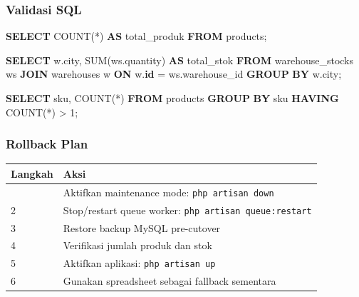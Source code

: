 \documentclass[
]{article}
\newenvironment{Shaded}{}{}
\newcommand{\DecValTok}[1]{\textcolor[rgb]{0.25,0.63,0.44}{#1}}
\newcommand{\FunctionTok}[1]{\textcolor[rgb]{0.02,0.16,0.49}{#1}}
\newcommand{\KeywordTok}[1]{\textcolor[rgb]{0.00,0.44,0.13}{\textbf{#1}}}
\newcommand{\NormalTok}[1]{#1}
\newcommand{\OperatorTok}[1]{\textcolor[rgb]{0.40,0.40,0.40}{#1}}
\begin{document}
\subsubsection{Validasi SQL}\label{validasi-sql}

\begin{Shaded}
\begin{Highlighting}[]
\KeywordTok{SELECT} \FunctionTok{COUNT}\NormalTok{(}\OperatorTok{*}\NormalTok{) }\KeywordTok{AS}\NormalTok{ total\_produk }\KeywordTok{FROM}\NormalTok{ products;}

\KeywordTok{SELECT}\NormalTok{ w.city, }\FunctionTok{SUM}\NormalTok{(ws.quantity) }\KeywordTok{AS}\NormalTok{ total\_stok}
\KeywordTok{FROM}\NormalTok{ warehouse\_stocks ws}
\KeywordTok{JOIN}\NormalTok{ warehouses w }\KeywordTok{ON}\NormalTok{ w.}\KeywordTok{id} \OperatorTok{=}\NormalTok{ ws.warehouse\_id}
\KeywordTok{GROUP} \KeywordTok{BY}\NormalTok{ w.city;}

\KeywordTok{SELECT}\NormalTok{ sku, }\FunctionTok{COUNT}\NormalTok{(}\OperatorTok{*}\NormalTok{) }\KeywordTok{FROM}\NormalTok{ products }\KeywordTok{GROUP} \KeywordTok{BY}\NormalTok{ sku }\KeywordTok{HAVING} \FunctionTok{COUNT}\NormalTok{(}\OperatorTok{*}\NormalTok{) }\OperatorTok{\textgreater{}} \DecValTok{1}\NormalTok{;}
\end{Highlighting}
\end{Shaded}

\subsubsection{Rollback Plan}\label{rollback-plan}

\begin{longtable}[]{@{}P{0.26\textwidth}P{0.70\textwidth}@{}}
\toprule\noalign{}
Langkah & Aksi \\
\midrule\noalign{}
\endhead
\bottomrule\noalign{}
 & Aktifkan maintenance mode: \texttt{php\ artisan\ down} \\
2 & Stop/restart queue worker: \texttt{php\ artisan\ queue:restart} \\
3 & Restore backup MySQL pre-cutover \\
4 & Verifikasi jumlah produk dan stok \\
5 & Aktifkan aplikasi: \texttt{php\ artisan\ up} \\
6 & Gunakan spreadsheet sebagai fallback sementara \\
\end{longtable}
\end{document}
